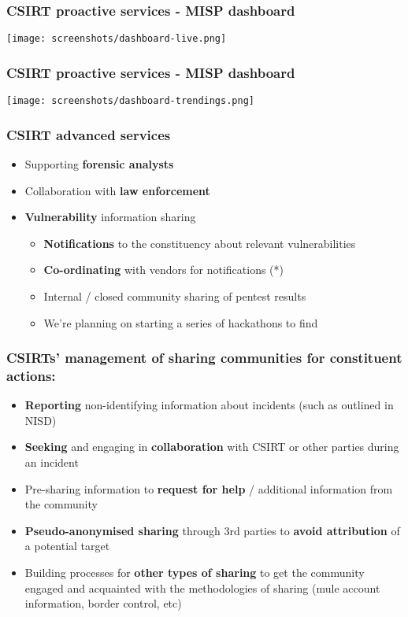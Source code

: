 \begin{frame}
\frametitle{CSIRT proactive services - MISP dashboard}
\texttt{[image: screenshots/dashboard-live.png]}
\end{frame}

\begin{frame}
\frametitle{CSIRT proactive services - MISP dashboard}
\texttt{[image: screenshots/dashboard-trendings.png]}
\end{frame}

\begin{frame}
\frametitle{CSIRT advanced services}
\begin{itemize}
	\item Supporting {\bf forensic analysts}
	\item Collaboration with {\bf law enforcement}
	\item {\bf Vulnerability} information sharing
	\begin{itemize}
		\item {\bf Notifications} to the constituency about relevant vulnerabilities
		\item {\bf Co-ordinating} with vendors for notifications (*)
		\item Internal / closed community sharing of pentest results
		\item We're planning on starting a series of hackathons to find
	\end{itemize}
\end{itemize}
\end{frame}


\begin{frame}
\frametitle{CSIRTs' management of sharing communities for constituent actions:}
\begin{itemize}
	\item {\bf Reporting} non-identifying information about incidents (such as outlined in NISD)
	\item {\bf Seeking} and engaging in {\bf collaboration} with CSIRT or other parties during an incident
	\item Pre-sharing information to {\bf request for help} / additional information from the community
	\item {\bf Pseudo-anonymised sharing} through 3rd parties to {\bf avoid attribution} of a potential target
	\item Building processes for {\bf other types of sharing} to get the community engaged and acquainted with the methodologies of sharing (mule account information, border control, etc)
\end{itemize}
\end{frame}

